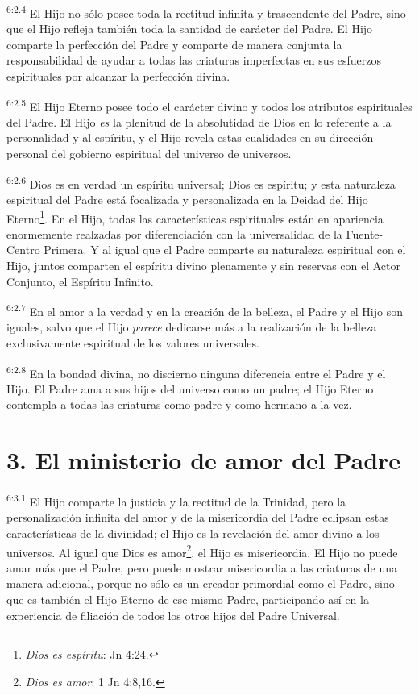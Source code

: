 \par
\textsuperscript{6:2.4} El Hijo no sólo posee toda la rectitud infinita y trascendente del Padre, sino que el Hijo refleja también toda la santidad de carácter del Padre. El Hijo comparte la perfección del Padre y comparte de manera conjunta la responsabilidad de ayudar a todas las criaturas imperfectas en sus esfuerzos espirituales por alcanzar la perfección divina.

\par
\textsuperscript{6:2.5} El Hijo Eterno posee todo el carácter divino y todos los atributos espirituales del Padre. El Hijo \textit{es} la plenitud de la absolutidad de Dios en lo referente a la personalidad y al espíritu, y el Hijo revela estas cualidades en su dirección personal del gobierno espiritual del universo de universos.

\par
\textsuperscript{6:2.6} Dios es en verdad un espíritu universal; Dios es espíritu; y esta naturaleza espiritual del Padre está focalizada y personalizada en la Deidad del Hijo Eterno\footnote{\textit{Dios es espíritu}: Jn 4:24.}. En el Hijo, todas las características espirituales están en apariencia enormemente realzadas por diferenciación con la universalidad de la Fuente-Centro Primera. Y al igual que el Padre comparte su naturaleza espiritual con el Hijo, juntos comparten el espíritu divino plenamente y sin reservas con el Actor Conjunto, el Espíritu Infinito.

\par
\textsuperscript{6:2.7} En el amor a la verdad y en la creación de la belleza, el Padre y el Hijo son iguales, salvo que el Hijo \textit{parece} dedicarse más a la realización de la belleza exclusivamente espiritual de los valores universales.

\par
\textsuperscript{6:2.8} En la bondad divina, no discierno ninguna diferencia entre el Padre y el Hijo. El Padre ama a sus hijos del universo como un padre; el Hijo Eterno contempla a todas las criaturas como padre y como hermano a la vez.

\section*{3. El ministerio de amor del Padre}
\par
\textsuperscript{6:3.1} El Hijo comparte la justicia y la rectitud de la Trinidad, pero la personalización infinita del amor y de la misericordia del Padre eclipsan estas características de la divinidad; el Hijo es la revelación del amor divino a los universos. Al igual que Dios es amor\footnote{\textit{Dios es amor}: 1 Jn 4:8,16.}, el Hijo es misericordia. El Hijo no puede amar más que el Padre, pero puede mostrar misericordia a las criaturas de una manera adicional, porque no sólo es un creador primordial como el Padre, sino que es también el Hijo Eterno de ese mismo Padre, participando así en la experiencia de filiación de todos los otros hijos del Padre Universal.

